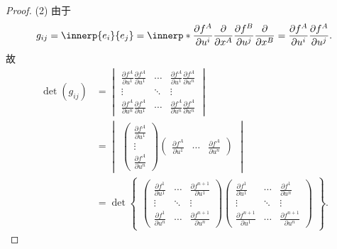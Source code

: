 \begin{proof}
  (2) 由于
  \[g_{ij}=\innerp{e_i}{e_j} = \innerp*{\frac{\partial f^A}{\partial u^i}\frac{\partial}{\partial x^A}}
                                      {\frac{\partial f^B}{\partial u^j}\frac{\partial}{\partial x^B}}
    = \frac{\partial f^A}{\partial u^i}\frac{\partial f^A}{\partial u^j}.\]
  故
  \begin{align*}
    \det(g_{ij})
    & = \begin{vmatrix}
      \frac{\partial f^A}{\partial u^1}\frac{\partial f^A}{\partial u^1} &
      \cdots &
      \frac{\partial f^A}{\partial u^1}\frac{\partial f^A}{\partial u^n} \\
      \vdots & \ddots & \vdots \\
      \frac{\partial f^A}{\partial u^n}\frac{\partial f^A}{\partial u^1} &
      \cdots &
      \frac{\partial f^A}{\partial u^n}\frac{\partial f^A}{\partial u^n}
      \end{vmatrix} \\
    & = \begin{vmatrix}
      \begin{pmatrix}
        \frac{\partial f^A}{\partial u^1} \\
        \vdots \\
        \frac{\partial f^A}{\partial u^n}
      \end{pmatrix}
      \begin{pmatrix}
        \frac{\partial f^A}{\partial u^1} & \cdots & \frac{\partial f^A}{\partial u^n}
      \end{pmatrix}
    \end{vmatrix} \\
    &  = \det\begin{Bmatrix}
      \begin{pmatrix}
        \frac{\partial f^1}{\partial u^1} & \cdots & \frac{\partial f^{n+1}}{\partial u^1} \\
        \vdots & \ddots & \vdots \\
        \frac{\partial f^1}{\partial u^n} & \cdots & \frac{\partial f^{n+1}}{\partial u^n}
      \end{pmatrix}
      \begin{pmatrix}
        \frac{\partial f^1}{\partial u^1} & \cdots & \frac{\partial f^1}{\partial u^n} \\
        \vdots & \ddots & \vdots \\
        \frac{\partial f^{n+1}}{\partial u^1} & \cdots & \frac{\partial f^{n+1}}{\partial u^n}
      \end{pmatrix}
    \end{Bmatrix}.

\end{align*}
\end{proof}
